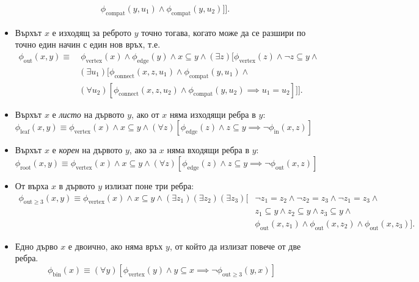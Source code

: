 \begin{example}
\begin{itemize}
\begin{align*}
                                & \phi_{\text{compat}}(y,u_1) \land \phi_{\text{compat}}(y,u_2)]].
    \end{align*}
  \item
    Върхът $x$ е изходящ за реброто $y$ точно тогава, когато може да се разшири по точно един начин с един нов връх, т.е.
    \begin{align*}
      \phi_{\text{out}}(x,y) \equiv &\ \phi_{\text{vertex}}(x) \land \phi_{\text{edge}}(y) \land x \subseteq y \land (\exists z)[\phi_{\text{vertex}}(z) \land \neg z \subseteq y \land \\
                                 & (\exists u_1)[\phi_{\text{connect}}(x,z,u_1) \land \phi_{\text{compat}}(y,u_1) \land \\
                                 & (\forall u_2)[\phi_{\text{connect}}(x,z,u_2) \land \phi_{\text{compat}}(y,u_2) \implies u_1 = u_2]]].
    \end{align*}
  \item
    Върхът $x$ е \emph{листо} на дървото $y$, ако от $x$ няма изходящи ребра в $y$:
    \[\phi_{\text{leaf}}(x,y) \equiv \phi_{\text{vertex}}(x) \land x \subseteq y \land (\forall z)[\phi_{\text{edge}}(z) \land z \subseteq y \implies \neg \phi_{\text{in}}(x,z)]\]
  \item
    Върхът $x$ е \emph{корен} на дървото $y$, ако за $x$ няма входящи ребра в $y$:
    \[\phi_{\text{root}}(x,y) \equiv \phi_{\text{vertex}}(x) \land x \subseteq y \land (\forall z)[\phi_{\text{edge}}(z) \land z \subseteq y \implies \neg \phi_{\text{out}}(x,z)]\]
  \item
    От върха $x$ в дървото $y$ излизат поне три ребра:
    \begin{align*}
      \phi_{\text{out}\geq 3}(x,y) \equiv \phi_{\text{vertex}}(x) \land x \subseteq y \land (\exists z_1)(\exists z_2)(\exists z_3)[ & \neg z_1 = z_2 \land \neg z_2 = z_3 \land \neg z_1 = z_3 \land \\
                                                                                                                       & z_1 \subseteq y \land z_2 \subseteq y \land z_3 \subseteq y \land\\
                                                                                                                       & \phi_{\text{out}}(x,z_1) \land \phi_{\text{out}}(x,z_2) \land \phi_{\text{out}}(x,z_3)].
    \end{align*}
  \item
    Едно дърво $x$ е двоично, ако няма връх $y$, от който да излизат повече от две ребра.
    \[\phi_{\text{bin}}(x) \equiv (\forall y)[\phi_{\text{vertex}}(y) \land y \subseteq x \implies \neg \phi_{\text{out}\geq 3}(y,x)]\]
  \end{itemize}
\end{example}

